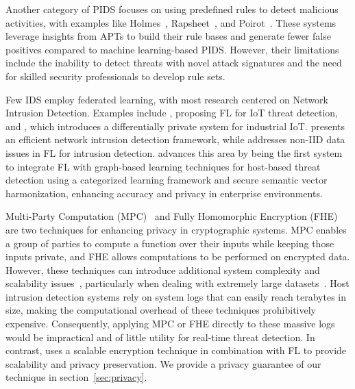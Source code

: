  Another category of PIDS focuses on using predefined rules to detect malicious activities, with examples like Holmes~\cite{holmes2019}, Rapsheet~\cite{rapsheet2020}, and Poirot~\cite{poirot2019}. These systems leverage insights from APTs to build their rule bases and generate fewer false positives compared to machine learning-based PIDS. However, their limitations include the inability to detect threats with novel attack signatures and the need for skilled security professionals to develop rule sets.

 Few IDS employ federated learning, with most research centered on Network Intrusion Detection. Examples include \cite{man2021intelligent}, proposing FL for IoT threat detection, and \cite{friha20232df}, which introduces a differentially private system for industrial IoT. \cite{li2023efficient} presents an efficient network intrusion detection framework, while \cite{guo2023new} addresses non-IID data issues in FL for intrusion detection. \Sys advances this area by being the first system to integrate FL with graph-based learning techniques for host-based threat detection using a categorized \gnnshort learning framework and secure semantic vector harmonization, enhancing accuracy and privacy in enterprise environments.

 Multi-Party Computation (MPC)~\cite{cramer2015secure} and Fully Homomorphic Encryption (FHE)  \cite{armknecht2015guide} are two techniques for enhancing privacy in cryptographic systems. MPC enables a group of parties to compute a function over their inputs while keeping those inputs private, and FHE allows computations to be performed on encrypted data. However, these techniques can introduce additional system complexity and scalability issues~\cite{du2001secure, gentry2009fully, asharov2013more}, particularly when dealing with extremely large datasets~\cite{menezes2018handbook}. Host intrusion detection systems rely on system logs that can easily reach terabytes in size, making the computational overhead of these techniques prohibitively expensive. Consequently, applying MPC or FHE directly to these massive logs would be impractical and of little utility for real-time threat detection. In contrast, \Sys uses a scalable encryption technique in combination with FL to provide scalability and privacy preservation. We provide a privacy guarantee of our technique in section~\ref{sec:privacy}.

